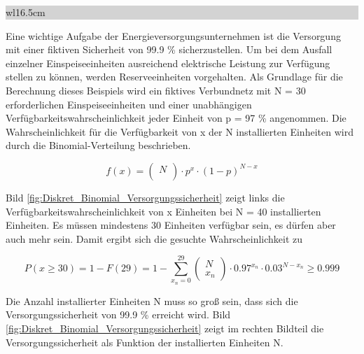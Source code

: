 \clearpage

\noindent
\colorbox{lightgray}{%
%
\renewcommand\arraystretch{0.6}%
\begin{tabular}{ wl{16.5cm} }
{\selectfont{Beispiel: Versorgungssicherheit}}
\end{tabular}%
}\medskip 

\noindent Eine wichtige Aufgabe der Energieversorgungsunternehmen ist die Versorgung mit einer fiktiven Sicherheit von 99.9 \% sicherzustellen. Um bei dem Ausfall einzelner Einspeiseeinheiten ausreichend elektrische Leistung zur Verf\"{u}gung stellen zu k\"{o}nnen, werden Reserveeinheiten vorgehalten. Als Grundlage f\"{u}r die Berechnung dieses Beispiels wird ein fiktives Verbundnetz mit N = 30 erforderlichen Einspeiseeinheiten und einer unabh\"{a}ngigen Verf\"{u}gbarkeitswahrscheinlichkeit jeder Einheit von p = 97 \% angenommen. Die Wahrscheinlichkeit f\"{u}r die Verf\"{u}gbarkeit von x der N installierten Einheiten wird durch die Binomial-Verteilung beschrieben.

\begin{equation}\label{eq:fourhundredthirtyfour}
f(x)=\left(\begin{array}{l} {N} \\ 
\end{array}\right)\cdot p^{x} \cdot (1-p)^{N-x}
\end{equation}

\noindent Bild \ref{fig:Diskret_Binomial_Versorgungssicherheit} zeigt links die Verf\"{u}gbarkeitswahrscheinlichkeit von x Einheiten bei N = 40 installierten Einheiten. Es m\"{u}ssen mindestens 30 Einheiten verf\"{u}gbar sein, es d\"{u}rfen aber auch mehr sein. Damit ergibt sich die gesuchte Wahrscheinlichkeit zu

\begin{equation}\label{eq:fourhundredthirtyfive}
P(x\ge 30)=1-F(29)=1-\sum _{x_{n} =0}^{29}\left(\begin{array}{l} {N} \\ 
{x_{n} } \end{array}\right)\cdot 0.97^{x_{n}} \cdot 0.03^{N-x_{n}}  \ge 0.999
\end{equation}

\noindent Die Anzahl installierter Einheiten N muss so gro{\ss} sein, dass sich die Versorgungssicherheit von 99.9 \% erreicht wird. Bild \ref{fig:Diskret_Binomial_Versorgungssicherheit} zeigt im rechten Bildteil die Versorgungssicherheit als Funktion der installierten Einheiten N. 

